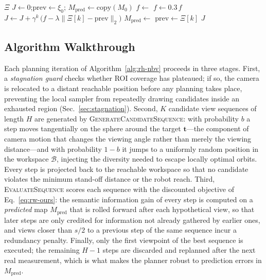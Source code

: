 \begin{algorithm}[t]
\begin{algorithmic}[1]
    \EndFor
    \State \Return $\Xi$
\EndProcedure
\Statex
{}
    \State $J \gets 0$;\quad $\mathrm{prev} \gets \xi_0$;\quad
           $M_{\mathrm{pred}} \gets \mathrm{copy}(M_0)$
        \State $f \gets$ 
            \State $f \gets 0.3\,f$ 
        \EndIf
        \State $J \gets J + \gamma^{k}\,
               \bigl(f - \lambda \lVert \Xi[k] - \mathrm{prev} \rVert_2\bigr)$
        \State $M_{\mathrm{pred}} \gets$
        \State $\mathrm{prev} \gets \Xi[k]$
    \EndFor
    \State \Return $J$
\EndProcedure
\end{algorithmic}
\end{algorithm}

\subsection{Algorithm Walkthrough}
\label{sec:alg-walkthrough}

Each planning iteration of Algorithm~\ref{alg:rh-nbv} proceeds in three
stages. First, a \emph{stagnation guard} checks whether ROI coverage has
plateaued; if so, the camera is relocated to a distant reachable position
before any planning takes place, preventing the local sampler from
repeatedly drawing candidates inside an exhausted region
(Sec.~\ref{sec:stagnation}). Second, $K$ candidate view sequences of
length $H$ are generated by \textsc{GenerateCandidateSequence}: with
probability $b$ a step moves tangentially on the sphere around the target
$\mathbf{t}$---the component of camera motion that changes the viewing
angle rather than merely the viewing distance---and with probability
$1-b$ it jumps to a uniformly random position in the workspace
$\mathcal{B}$, injecting the diversity needed to escape locally optimal
orbits. Every step is projected back to the reachable workspace so that
no candidate violates the minimum stand-off distance or the robot reach.
Third, \textsc{EvaluateSequence} scores each sequence with the discounted
objective of Eq.~\ref{eq:rw-ours}: the semantic information gain of every
step is computed on a \emph{predicted} map $M_{\mathrm{pred}}$ that is
rolled forward after each hypothetical view, so that later steps are only
credited for information not already gathered by earlier ones, and views
closer than $s/2$ to a previous step of the same sequence incur a
redundancy penalty. Finally, only the first viewpoint of the best
sequence is executed; the remaining $H-1$ steps are discarded and
replanned after the next real measurement, which is what makes the
planner robust to prediction errors in $M_{\mathrm{pred}}$.

